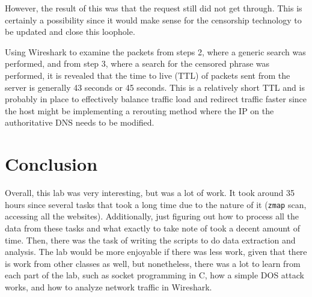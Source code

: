 \documentclass[11pt]{article}
\begin{document}
However, the result of this was that the request still did not get through. This is certainly a possibility
since it would make sense for the censorship technology to be updated and close this loophole.

Using Wireshark to examine the packets from steps 2, where a generic search was performed, and from
step 3, where a search for the censored phrase was performed, it is revealed that the time to live (TTL)
of packets sent from the server is generally 43 seconds or 45 seconds. This is a relatively short TTL
and is probably in place to effectively balance traffic load and redirect traffic faster since the host
might be implementing a rerouting method where the IP on the authoritative DNS needs to be modified.
\section*{Conclusion}
Overall, this lab was very interesting, but was a lot of work. It took around 35 hours since several
tasks that took a long time due to the nature of it (\verb|zmap| scan, accessing all the websites). 
Additionally, just figuring out how to process all the data from these tasks and what exactly to take note
of took a decent amount of time. Then, there was the task of writing the scripts to do data extraction
and analysis. The lab would be more enjoyable if there was less work, given that there is work from
other classes as well, but nonetheless, there was a lot to learn from each part of the lab, such as socket
programming in C, how a simple DOS attack works, and how to analyze network traffic in Wireshark.



\end{document}
